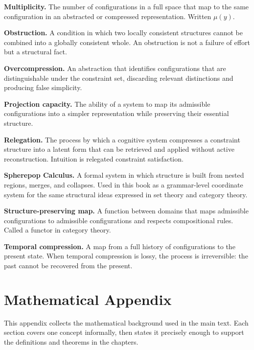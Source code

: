 \documentclass[11pt]{book}
\theoremstyle{plain}
\theoremstyle{definition}
\theoremstyle{remark}
\begin{document}
\textbf{Multiplicity.} The number of configurations in a full space
that map to the same configuration in an abstracted or compressed
representation. Written $\mu(y)$.

\textbf{Obstruction.} A condition in which two locally consistent
structures cannot be combined into a globally consistent whole. An
obstruction is not a failure of effort but a structural fact.

\textbf{Overcompression.} An abstraction that identifies configurations
that are distinguishable under the constraint set, discarding relevant
distinctions and producing false simplicity.

\textbf{Projection capacity.} The ability of a system to map its
admissible configurations into a simpler representation while
preserving their essential structure.

\textbf{Relegation.} The process by which a cognitive system compresses
a constraint structure into a latent form that can be retrieved and
applied without active reconstruction. Intuition is relegated
constraint satisfaction.

\textbf{Spherepop Calculus.} A formal system in which structure is
built from nested regions, merges, and collapses. Used in this book
as a grammar-level coordinate system for the same structural ideas
expressed in set theory and category theory.

\textbf{Structure-preserving map.} A function between domains that maps
admissible configurations to admissible configurations and respects
compositional rules. Called a functor in category theory.

\textbf{Temporal compression.} A map from a full history of
configurations to the present state. When temporal compression is lossy,
the process is irreversible: the past cannot be recovered from the
present.

\chapter*{Mathematical Appendix}

This appendix collects the mathematical background used in the main
text. Each section covers one concept informally, then states it
precisely enough to support the definitions and theorems in the
chapters.
\end{document}

